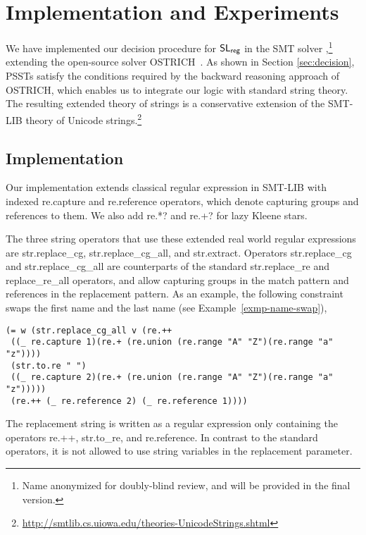 
\section{Implementation and Experiments}
\label{sect:impl}

We have implemented our decision procedure for $\mathsf{SL}_{\sf reg}$ in the SMT
solver \ostrich,\footnote{Name anonymized for doubly-blind review,
and will be provided in the final version.} extending the
open-source solver OSTRICH~\cite{CHL+19}.
As shown in Section \ref{sec:decision},
PSSTs satisfy the conditions required by the backward reasoning
approach of OSTRICH, which enables us to integrate our logic with
standard string theory. The resulting extended theory of strings is a
conservative extension of the SMT-LIB theory of Unicode
strings.\footnote{\url{http://smtlib.cs.uiowa.edu/theories-UnicodeStrings.shtml}}

\subsection{Implementation}

Our implementation extends classical regular expression in SMT-LIB
with indexed {\sf re.capture} and {\sf re.reference} operators, which
denote capturing groups and references to them. We also add {\sf re.*?}
and {\sf re.+?} for lazy Kleene stars.

The three string operators that use these extended real world regular
expressions are {\sf str.replace\_cg}, {\sf str.replace\_cg\_all}, and
{\sf str.extract}. Operators {\sf str.replace\_cg} and {\sf
  str.replace\_cg\_all} are counterparts of the standard {\sf
  str.replace\_re} and {\sf replace\_re\_all} operators, and allow
capturing groups in the match pattern and references in the
replacement pattern. As an example, the following constraint swaps the first name and the last name (see Example~\ref{exmp-name-swap}),
%
{\small
\begin{verbatim}
(= w (str.replace_cg_all v (re.++  
 ((_ re.capture 1)(re.+ (re.union (re.range "A" "Z")(re.range "a" "z"))))
 (str.to.re " ") 
 ((_ re.capture 2)(re.+ (re.union (re.range "A" "Z")(re.range "a" "z")))))
 (re.++ (_ re.reference 2) (_ re.reference 1))))
\end{verbatim}
}
%
The replacement string is written as a regular expression only
containing the operators {\sf re.++}, {\sf str.to\_re}, and {\sf re.reference}. In contrast to the standard operators, it is not allowed to use string variables in the 
replacement parameter.

